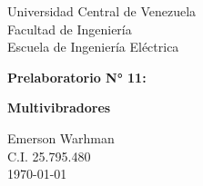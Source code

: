 \begin{titlepage}
    \centering
    \Large
    Universidad Central de Venezuela\\
    Facultad de Ingeniería\\
    Escuela de Ingeniería Eléctrica
    \vspace*{8cm}

    \Huge
    \textbf{Prelaboratorio N° 11: } 

    \textbf{Multivibradores}
    \vfill


    \Large

    Emerson Warhman \\
    C.I. 25.795.480 \\
    \today

\end{titlepage}